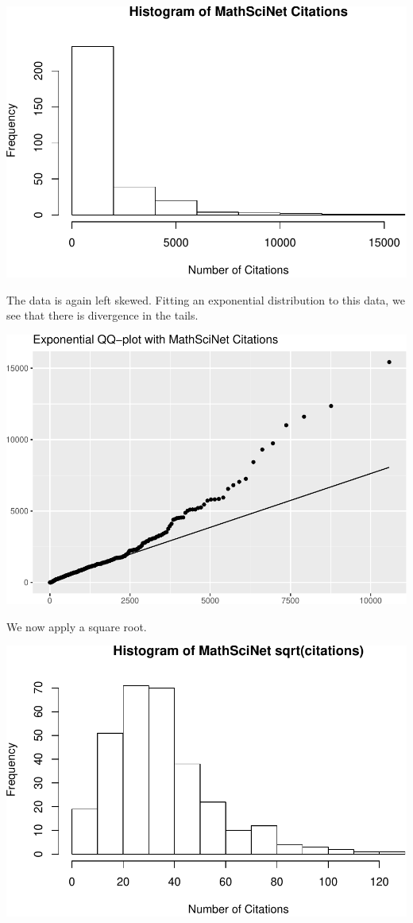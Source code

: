 \documentclass[]{article}
\begin{document}
\includegraphics{final_files/figure-latex/unnamed-chunk-11-1.pdf}

The data is again left skewed. Fitting an exponential distribution to
this data, we see that there is divergence in the tails.

\includegraphics{final_files/figure-latex/unnamed-chunk-12-1.pdf}

We now apply a square root.

\includegraphics{final_files/figure-latex/unnamed-chunk-13-1.pdf}
\end{document}
